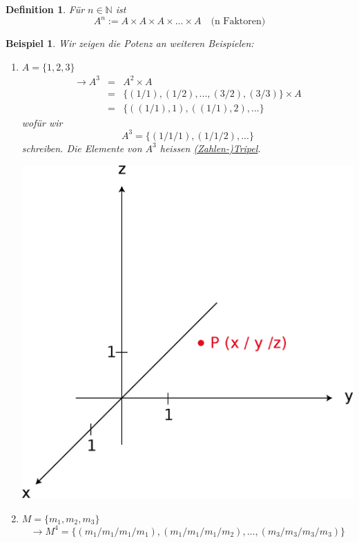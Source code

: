 \documentclass{report}
\newtheorem{mydef}{Definition}
\newtheorem{myexample}{Beispiel}
\begin{document}
\begin{mydef}Für $n \in \mathbb{N}$ ist
\begin{equation}A^n := A \times A \times A \times ... \times A \quad \mbox{(n Faktoren)}\end{equation}\end{mydef}
\begin{myexample}Wir zeigen die Potenz an weiteren Beispielen:
\begin{enumerate}
\item $A = \{1, 2, 3\}$
\begin{eqnarray}\to A^3 & = &  A^2 \times A\\ \nonumber
& = & \{(1/1), (1/2), ..., (3/2), (3/3)\} \times A\\ \nonumber
& = & \{((1/1),1), ((1/1),2), ...\}\end{eqnarray}
wofür wir
\begin{equation}A^3 = \{(1/1/1), (1/1/2), ...\}\end{equation}
schreiben. Die Elemente von $A^3$ heissen \underline{(Zahlen-)Tripel}.
\begin{center}\includegraphics[scale=0.25]{img/2_5-zahlentripel.eps}\end{center}
\item $M = \{m_1, m_2, m_3\}$
\begin{equation}\to M^4 = \{(m_1/m_1/m_1/m_1), (m_1/m_1/m_1/m_2), ..., (m_3/m_3/m_3/m_3)\}\end{equation}

\end{enumerate}
\end{myexample}
\end{document}
